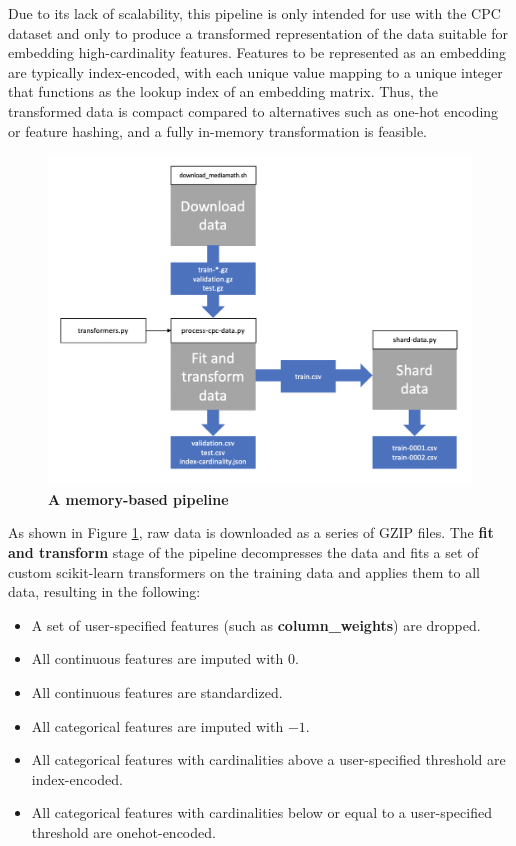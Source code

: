 \documentclass{proc}
\begin{document}
Due to its lack of scalability, this pipeline is only intended for use with the CPC dataset and only to produce a transformed representation of the data suitable for embedding high-cardinality features. Features to be represented as an embedding are typically index-encoded, with each unique value mapping to a unique integer that functions as the lookup index of an embedding matrix. Thus, the transformed data is compact compared to alternatives such as one-hot encoding or feature hashing, and a fully in-memory transformation is feasible.

\begin{figure}[h!]
		\includegraphics*[scale=0.4]{../figures/memory-based-pipeline.png}
		\caption{\textbf{A memory-based pipeline}}
		\label{fig:memory-based-pipeline}
\end{figure}

As shown in Figure \ref{fig:memory-based-pipeline}, raw data is downloaded as a series of GZIP files. The \textbf{fit and transform} stage of the pipeline decompresses the data and fits a set of custom scikit-learn transformers on the training data and applies them to all data, resulting in the following:

\begin{itemize}
\item{A set of user-specified features (such as \textbf{column\_weights}) are dropped.}
\item{All continuous features are imputed with $0$.}
\item{All continuous features are standardized.}
\item{All categorical features are imputed with $-1$.}
\item{All categorical features with cardinalities above a user-specified threshold are index-encoded.}
\item{All categorical features with cardinalities below or equal to a user-specified threshold are onehot-encoded.}
\end{itemize}
\end{document}
